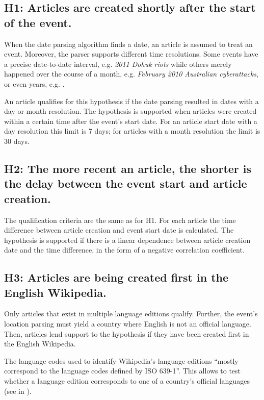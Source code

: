 \subsection*{H1: Articles are created shortly after the start of the event.}

When the date parsing algorithm finds a date, an article is assumed to treat an event.
Moreover, the parser supports different time resolutions.
Some events have a precise date-to-date interval, e.g. \emph{2011 Dohuk riots} while others merely happened over the course of a month, e.g. \emph{February 2010 Australian cyberattacks}, or even years, e.g. .

An article qualifies for this hypothesis if the date parsing resulted in dates with a day or month resolution.
The hypothesis is supported when articles were created within a certain time after the event's start date.
For an article start date with a day resolution this limit is 7 days; for articles with a month resolution the limit is 30 days.

\subsection*{H2: The more recent an article, the shorter is the delay between the event start and article creation.}

The qualification criteria are the same as for H1. 
For each article the time difference between article creation and event start date is calculated. 
The hypothesis is supported if there is a linear dependence between article creation date and the time difference, in the form of a negative correlation coefficient.

\subsection*{H3: Articles are being created first in the English Wikipedia.}

Only articles that exist in multiple language editions qualify.
Further, the event's location parsing must yield a country where English is not an official language.
Then, articles lend support to the hypothesis if they have been created first in the English Wikipedia.

The language codes used to identify Wikipedia's language editions ``mostly correspond to the language codes defined by \ac{ISO} 639-1''.\cite{wplist} 
This allows to test whether a language edition corresponds to one of a country's official languages (see  in ).

